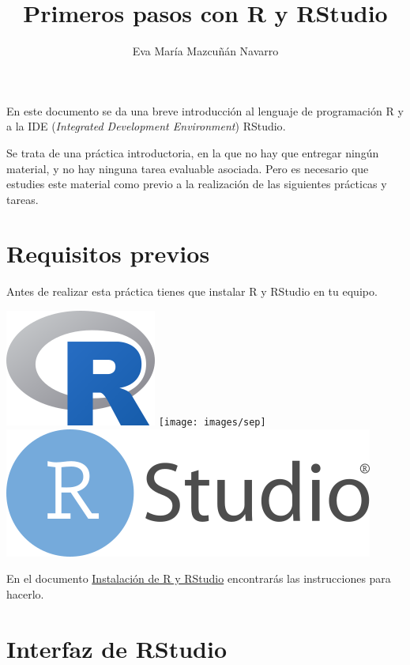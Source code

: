 \documentclass[
  title=normal,
  notoc,
  bib=normal]{mnye}
\title{Primeros pasos con R y RStudio}
\author{Eva María Mazcuñán Navarro}
\date{}
\begin{document}
\maketitle

%

{
\hypersetup{linkcolor=etoccolor}
\setcounter{tocdepth}{2}
\tableofcontents
}
\hypertarget{section}{%
\section*{}\label{section}}

En este documento se da una breve introducción al lenguaje de programación \textsf{R} y a la IDE (\textit{Integrated Development Environment}) \textsf{RStudio}.

Se trata de una práctica introductoria, en la que no hay que entregar ningún material, y no hay ninguna tarea evaluable asociada. Pero es necesario
que estudies este material como previo a la realización de las siguientes prácticas y tareas.

\hypertarget{prerequisites}{%
\section{Requisitos previos}\label{prerequisites}}

Antes de realizar esta práctica tienes que instalar \textsf{R} y \textsf{RStudio} en tu equipo.

\begin{center}\includegraphics[width=0.14\linewidth]{images/r-logo} \texttt{[image: images/sep]} \includegraphics[width=0.3\linewidth]{images/rstudio-logo} \end{center}

En el documento \href{https://emazcunan.github.io/install-r-rstudio}{Instalación de R y RStudio} encontrarás las instrucciones para hacerlo.

\hypertarget{rstudio}{%
\section{Interfaz de RStudio}\label{rstudio}}
\end{document}
